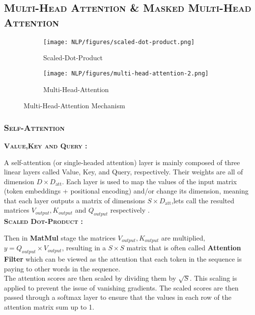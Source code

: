 \documentclass[a4paper,10pt]{article}
\begin{document}
\subsection{\scshape{Multi-Head Attention \& Masked Multi-Head Attention}}

\begin{figure}[H]
    \centering
    \begin{subfigure}[b]{0.25\textwidth}
        \centering
        \texttt{[image: NLP/figures/scaled-dot-product.png]}
        \caption{Scaled-Dot-Product}
    \end{subfigure}
    \begin{subfigure}[b]{0.25\textwidth}
        \centering
        \texttt{[image: NLP/figures/multi-head-attention-2.png]}
        \caption{Multi-Head-Attention}
    \end{subfigure}
    \caption{Multi-Head-Attention Mechanism}
\end{figure}

\subsubsection{\scshape{Self-Attention}}

\noindent\textbf{{\scshape{Value,Key and Query : \\}}}

\noindent A self-attention (or single-headed attention) layer is mainly composed of three linear layers called Value, Key, and Query, respectively. Their weights are all of dimension $D \times D_{\text{att}}$. Each layer is used to map the values of the input matrix (token embeddings + positional encoding) and/or change its dimension, meaning that each layer outputs a matrix of dimensions $S \times D_{\text{att}}$,lets call the resulted matrices $V_{output},K_{output}$ and $Q_{output}$ respectively .\\

\noindent\textbf{{\scshape{Scaled Dot-Product : \\}}}

\noindent Then in \textbf{MatMul} stage the matrices $V_{output},K_{output}$ are multiplied,$y = Q_{output} \times V_{output}$, resulting in a $S \times S$ matrix that is  often called \textbf{Attention Filter} which can be viewed as the attention that each token in the sequence is paying to other words in the sequence.\\


\noindent The attention scores are then scaled by dividing them by $\sqrt{S}$. This scaling is applied to prevent the issue of vanishing gradients. The scaled scores are then passed through a softmax layer to ensure that the values in each row of the attention matrix sum up to 1.\\
\end{document}
